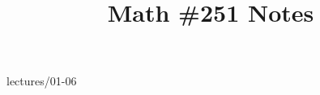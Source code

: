 \documentclass{scrartcl}
\title{Math \#251 Notes}
\begin{document}
\maketitle

\clearpage
\tableofcontents



{lectures/01-06}
\end{document}
